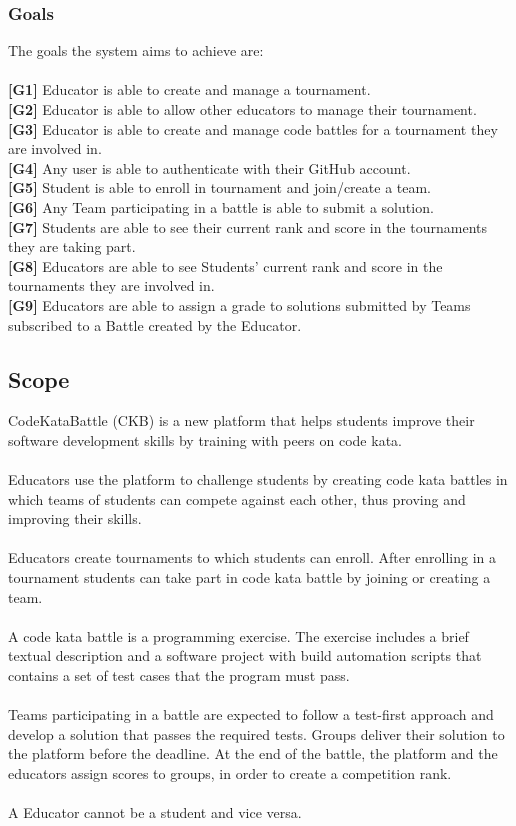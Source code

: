 \documentclass{article}
\begin{document}
\subsubsection{Goals}
The goals the system aims to achieve are:\\\\
\textbf{[G1]} Educator is able to create and manage a tournament.\\
\textbf{[G2]} Educator is able to allow other educators to manage their tournament.\\
\textbf{[G3]} Educator is able to create and manage code battles for a tournament they are involved in.\\
\textbf{[G4]} Any user is able to authenticate with their GitHub account. \\
\textbf{[G5]} Student is able to enroll in tournament and join/create a team.\\
\textbf{[G6]} Any Team participating in a battle is able to submit a solution.\\
\textbf{[G7]} Students are able to see their current rank and score in the tournaments they are taking part.\\
\textbf{[G8]} Educators are able to see Students’ current rank and score in the tournaments they are involved in.\\
\textbf{[G9]} Educators are able to assign a grade to solutions submitted by Teams subscribed to a Battle created by the Educator.\\
\subsection{Scope}
CodeKataBattle (CKB) is a new platform that helps students improve their software development skills by training with peers on code kata. 
\\\\
Educators use the platform to challenge students by creating code kata battles in which teams of students can compete against each other, thus proving and improving their skills. 
\\\\
Educators create tournaments to which students can enroll. After enrolling in a tournament students can take part in code kata battle by joining or creating a team.
\\\\
A code kata battle is a programming exercise.
The exercise includes a brief textual description and a software project with build automation scripts that contains a set of test cases that the program must pass.
\\\\
Teams participating in a battle are expected to follow a test-first approach and develop a solution that passes the required tests. Groups deliver their solution to the platform before the deadline.
At the end of the battle, the platform and the educators assign scores to groups, in order to create a competition rank.
\\\\
A Educator cannot be a student and vice versa.
\end{document}
